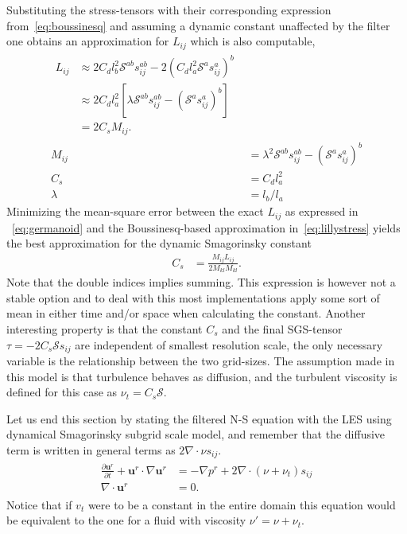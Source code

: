 Substituting the stress-tensors with their corresponding expression 
from~\ref{eq:boussinesq} and assuming a dynamic constant unaffected by the filter 
one obtains an approximation for $L_{ij}$ which is also computable,
\begin{align}
    \begin{split}
L_{ij} &\approx 2C_d l_b^2 \mathcal{S}^{ab} s^{ab}_{ij}
        -2 (C_d l_a^2 \mathcal{S}^a s^a_{ij})^b\\
        &\approx 2C_dl_a^2[\lambda\mathcal{S}^{ab}s^{ab}_{ij} 
        - (\mathcal{S}^{a}s^{a}_{ij})^b]\\
        &= 2C_s M_{ij}.
        \label{eq:lillystress}
    \end{split} \\
    M_{ij} &= \lambda^{2}\mathcal{S}^{ab}s_{ij}^{ab} - (\mathcal{S}^as_{ij}^a)^b\\
        C_s &= C_dl_a^2\\
        \lambda &= l_b/l_a
    \label{eq:dynsmagderivation}
\end{align}
Minimizing the mean-square error between the exact $L_{ij}$ as expressed in
~\ref{eq:germanoid} and the Boussinesq-based approximation 
in~\ref{eq:lillystress} yields the best approximation 
for the dynamic Smagorinsky constant 
%
\begin{align}
    C_s &= \frac{M_{ij}L_{ij}}{2M_{kl}M_{kl}}.
    \label{eq:dynsmag}
\end{align}
%
Note that the double indices implies summing. This expression is however not a 
stable option and to deal with this most implementations apply some sort of mean 
in either time and/or space when calculating the constant. Another interesting property 
is that the constant $C_s$ and the final SGS-tensor $\tau = -2C_s\mathcal{S}s_{ij}$ are 
independent of smallest resolution scale, the only necessary variable is the relationship 
between the two grid-sizes. The assumption made in this model is that turbulence behaves 
as diffusion, and the turbulent viscosity is defined for this case as $\nu_t = C_s\mathcal{S}$.

Let us end this section by stating the filtered N-S equation with the LES using 
dynamical Smagorinsky subgrid scale model, and remember that the diffusive term is written 
in general terms as $2\nabla \cdot \nu s_{ij}$.  
%
\begin{align}
    \begin{split}
        \frac{\partial \mathbf{u}^r}{\partial t} + \mathbf{u}^r\cdot \nabla\mathbf{u}^r
        &= -\nabla p^r +2\nabla \cdot (\nu + \nu_t) s_{ij} \\
        \nabla \cdot \mathbf{u}^r &= 0.
    \end{split}
	\label{eq:NSLES}
\end{align}
%
Notice that if $v_t$ were to be a constant in the entire domain this equation would 
be equivalent to the one for a fluid with viscosity $\nu'= \nu + \nu_t$.

